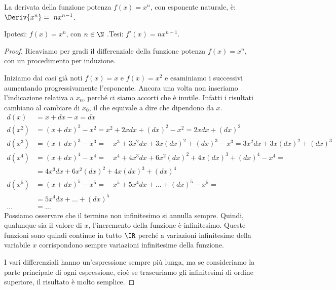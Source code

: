  \begin{teorema}
  \label{diff01_teoderpotenza}
  La derivata della funzione potenza \(f(x)= x^n\), con esponente 
naturale, è: \(\Deriv{x^n}=~nx^{n-1}\).
  \end{teorema}
\noindent Ipotesi: \(f(x)=x^n\), con \(n\in \N\) .\tab Tesi: 
\(f'(x)=nx^{n-1}\). 
\begin{proof}
Ricaviamo per gradi il differenziale della funzione potenza \(f(x)=x^n\), 
con un procedimento per induzione.

Iniziamo dai casi già noti \(f(x)=x\) e \(f(x)=x^2\) e esaminiamo i 
successivi aumentando progressivamente l'esponente. 
Ancora una volta non inseriamo l'indicazione relativa a \(x_0\), perché 
ci siamo accorti che è inutile. 
Infatti i risultati cambiano al cambiare di \(x_0\), il che equivale a 
dire che dipendono da \(x\).
\begin{align*}
  d(x) &=x+dx-x =dx\\
  d(x^2) &=(x+dx)^2-x^2 = x^2 +2xdx +(dx)^2 -x^2 = 2xdx +(dx)^2\\
  d(x^3) &=(x+dx)^3-x^3 = \quad{x^3+3x^2dx+3x(dx)^2+(dx)^3}-x^3=
                      3x^2dx+3x(dx)^2+(dx)^3\\
  d(x^4) &=(x+dx)^4-x^4 = 
           \quad{x^4+4x^3dx+6x^2(dx)^2+4x(dx)^3+(dx)^4}-x^4=\\
         &=4x^3dx+6x^2(dx)^2+4x(dx)^3+(dx)^4  \\
  d(x^5) &= (x+dx)^5-x^5 = \quad{x^5+5x^4dx+\dots +(dx)^5}-x^5=\\
         &=5x^4dx+\dots+(dx)^5\\
  \dots  &= \dots
\end{align*}
Possiamo osservare che il termine non infinitesimo si annulla sempre. 
Quindi, qualunque sia il valore di \(x\), l'incremento della funzione è 
infinitesimo. 
Queste funzioni sono quindi continue in tutto \(\IR\) perché a variazioni 
infinitesime della variabile \(x\) corrispondono sempre variazioni
infinitesime della funzione.

I vari differenziali hanno un'espressione sempre più lunga, ma se 
consideriamo la parte principale di ogni espressione, cioè se trascuriamo 
gli infinitesimi di ordine superiore, il risultato è molto semplice.


\end{proof}
